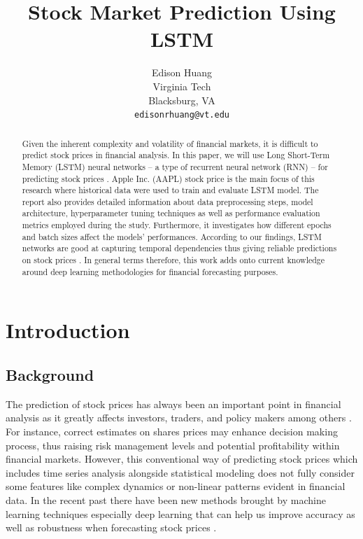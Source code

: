 \documentclass[10pt,twocolumn,letterpaper]{article}
\begin{document}
\title{Stock Market Prediction Using LSTM}

\author{Edison Huang\\
Virginia Tech\\
Blacksburg, VA\\
{\tt\small edisonrhuang@vt.edu}
}

\maketitle

\begin{abstract}
   Given the inherent complexity and volatility of financial markets, it is
   difficult to predict stock prices in financial analysis. In this paper, we
   will use Long Short-Term Memory (LSTM) neural networks – a type
   of recurrent neural network (RNN) – for predicting stock prices 
   \cite{parmar2018}. Apple Inc. (AAPL) stock price is the main focus of 
   this research where historical data were used to train and evaluate 
   LSTM model. The report also provides detailed information about 
   data preprocessing steps, model architecture, hyperparameter 
   tuning techniques as well as performance evaluation metrics employed 
   during the study. Furthermore, it investigates how different epochs and 
   batch sizes affect the models' performances. According to our findings, 
   LSTM networks are good at capturing temporal dependencies thus 
   giving reliable predictions on stock prices  \cite{parmar2018}. In general 
   terms therefore, this work adds onto current knowledge around deep 
   learning methodologies for financial forecasting purposes.
\end{abstract}

\section{Introduction}
\label{sec:introduction}

\subsection{Background}
The prediction of stock prices has always been an important point in financial
analysis as it greatly affects investors, traders, and policy makers among others
\cite{johnson2023}. For instance, correct estimates on shares prices may enhance 
decision making process, thus raising risk management levels and potential 
profitability within financial markets. However, this conventional way of predicting 
stock prices which includes time series analysis alongside statistical modeling does 
not fully consider some features like complex dynamics or non-linear patterns 
evident  in financial data. In the recent past there have been new methods brought 
by machine learning techniques especially deep learning that can help us improve 
accuracy as well as robustness when forecasting stock prices \cite{madge2015}.
\end{document}
